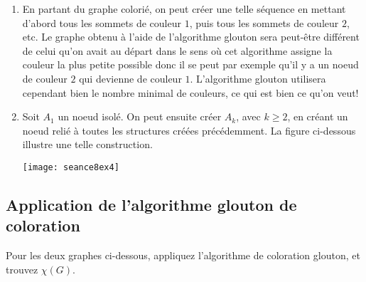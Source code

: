\begin{solution}
  \begin{enumerate}
    \item En partant du graphe colorié, on peut créer une telle séquence en mettant d'abord tous les sommets de couleur $1$, puis tous les sommets de couleur $2$, etc. Le graphe obtenu à l'aide de l'algorithme glouton sera peut-être différent de celui qu'on avait au départ dans le sens où cet algorithme assigne la couleur la plus petite possible donc il se peut par exemple qu'il y a un noeud de couleur $2$ qui devienne de couleur $1$. L'algorithme glouton utilisera cependant bien le nombre minimal de couleurs, ce qui est bien ce qu'on veut!
    \item  Soit $A_1$ un noeud isolé. On peut ensuite créer $A_k$, avec $k \geq 2$, en créant un noeud relié à toutes les structures créées précédemment. La figure  ci-dessous illustre une telle construction.
    \begin{center}
    	\texttt{[image: seance8ex4]}
     \end{center}
  \end{enumerate}
\end{solution}


\subsection{Application de l'algorithme glouton de coloration}
Pour les deux graphes ci-dessous, appliquez l'algorithme de coloration glouton, et trouvez $\chi(G)$.

